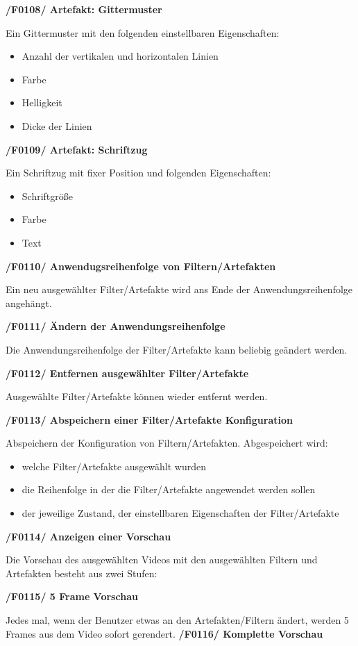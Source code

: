 \documentclass[parskip=full]{scrartcl}
\begin{document}
\textbf{/F0108/ Artefakt: Gittermuster}

Ein Gittermuster mit den folgenden einstellbaren Eigenschaften:
\begin{itemize}
\item Anzahl der vertikalen und horizontalen Linien
\item Farbe
\item Helligkeit
\item Dicke der Linien
\end{itemize}
\newpage
\textbf{/F0109/ Artefakt: Schriftzug}

Ein Schriftzug mit fixer Position und folgenden Eigenschaften:
\begin{itemize}
\item Schriftgröße
\item Farbe
\item Text
\end{itemize}

\textbf{/F0110/ Anwendugsreihenfolge von Filtern/Artefakten}

Ein neu ausgewählter Filter/Artefakte wird ans Ende der Anwendungsreihenfolge angehängt.

\textbf{/F0111/ Ändern der Anwendungsreihenfolge}

Die Anwendungsreihenfolge der Filter/Artefakte kann beliebig geändert werden.

\textbf{/F0112/ Entfernen ausgewählter Filter/Artefakte}

Ausgewählte Filter/Artefakte können wieder entfernt werden.

\textbf{/F0113/ Abspeichern einer Filter/Artefakte Konfiguration}

Abspeichern der Konfiguration von Filtern/Artefakten. Abgespeichert wird:
\begin{itemize}
\item welche Filter/Artefakte ausgewählt wurden
\item die Reihenfolge in der die Filter/Artefakte angewendet werden sollen
\item der jeweilige Zustand, der einstellbaren Eigenschaften der Filter/Artefakte
\end{itemize}

\textbf{/F0114/ Anzeigen einer Vorschau}

Die Vorschau des ausgewählten Videos mit den ausgewählten Filtern und Artefakten besteht aus zwei Stufen:

\textbf{/F0115/ 5 Frame Vorschau}

Jedes mal, wenn der Benutzer etwas an den Artefakten/Filtern ändert, werden 5 Frames aus dem Video sofort gerendert.
\newpage
\textbf{/F0116/ Komplette Vorschau}
\end{document}
